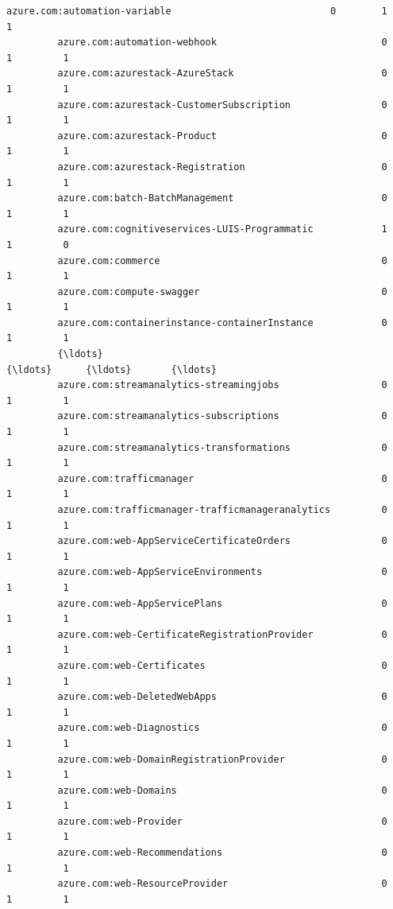 \documentclass[11pt]{article}
\begin{document}
\begin{Verbatim}[commandchars=\\\{\}]
         azure.com:automation-variable                            0        1         1   
         azure.com:automation-webhook                             0        1         1   
         azure.com:azurestack-AzureStack                          0        1         1   
         azure.com:azurestack-CustomerSubscription                0        1         1   
         azure.com:azurestack-Product                             0        1         1   
         azure.com:azurestack-Registration                        0        1         1   
         azure.com:batch-BatchManagement                          0        1         1   
         azure.com:cognitiveservices-LUIS-Programmatic            1        1         0   
         azure.com:commerce                                       0        1         1   
         azure.com:compute-swagger                                0        1         1   
         azure.com:containerinstance-containerInstance            0        1         1   
         {\ldots}                                                    {\ldots}      {\ldots}       {\ldots}   
         azure.com:streamanalytics-streamingjobs                  0        1         1   
         azure.com:streamanalytics-subscriptions                  0        1         1   
         azure.com:streamanalytics-transformations                0        1         1   
         azure.com:trafficmanager                                 0        1         1   
         azure.com:trafficmanager-trafficmanageranalytics         0        1         1   
         azure.com:web-AppServiceCertificateOrders                0        1         1   
         azure.com:web-AppServiceEnvironments                     0        1         1   
         azure.com:web-AppServicePlans                            0        1         1   
         azure.com:web-CertificateRegistrationProvider            0        1         1   
         azure.com:web-Certificates                               0        1         1   
         azure.com:web-DeletedWebApps                             0        1         1   
         azure.com:web-Diagnostics                                0        1         1   
         azure.com:web-DomainRegistrationProvider                 0        1         1   
         azure.com:web-Domains                                    0        1         1   
         azure.com:web-Provider                                   0        1         1   
         azure.com:web-Recommendations                            0        1         1   
         azure.com:web-ResourceProvider                           0        1         1   

\end{Verbatim}
\end{document}
